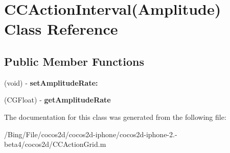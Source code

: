 \hypertarget{interface_c_c_action_interval_07_amplitude_08}{\section{C\-C\-Action\-Interval(Amplitude) Class Reference}
\label{interface_c_c_action_interval_07_amplitude_08}
}
\subsection*{Public Member Functions}
\begin{DoxyCompactItemize}
\item 
\hypertarget{interface_c_c_action_interval_07_amplitude_08_aedeedbafae47ef2db1cc8b97302514e3}{(void) -\/ {\bfseries set\-Amplitude\-Rate\-:}}\label{interface_c_c_action_interval_07_amplitude_08_aedeedbafae47ef2db1cc8b97302514e3}

\item 
\hypertarget{interface_c_c_action_interval_07_amplitude_08_a2ad037144f25e05544d1930ac995794e}{(C\-G\-Float) -\/ {\bfseries get\-Amplitude\-Rate}}\label{interface_c_c_action_interval_07_amplitude_08_a2ad037144f25e05544d1930ac995794e}

\end{DoxyCompactItemize}


The documentation for this class was generated from the following file\-:\begin{DoxyCompactItemize}
\item 
/\-Bing/\-File/cocos2d/cocos2d-\/iphone/cocos2d-\/iphone-\/2.-\/beta4/cocos2d/C\-C\-Action\-Grid.\-m\end{DoxyCompactItemize}
